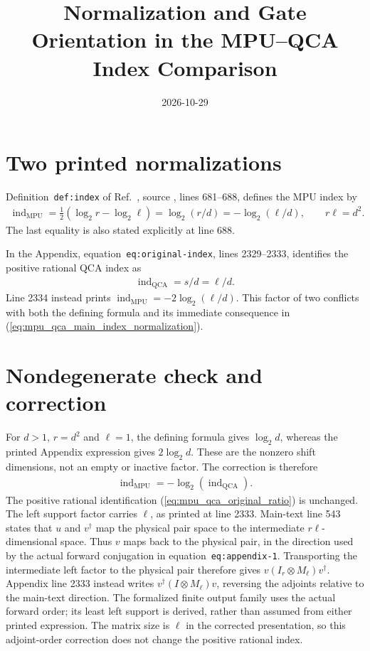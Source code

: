 \documentclass{article}
\title{Normalization and Gate Orientation in the MPU--QCA Index Comparison}
\author{}
\date{2026-10-29}
\begin{document}
\maketitle
{}

\section{Two printed normalizations}

Definition~\texttt{def:index} of Ref.~\cite{Cirac2017MPU}, source
, lines 681--688, defines the MPU index by
\begin{align}
    \operatorname{ind}_{\mathrm{MPU}}
    =\tfrac12(\log_2r-\log_2\ell)
    =\log_2(r/d)=-\log_2(\ell/d),
    \qquad r\ell=d^2.
    \label{eq:mpu_qca_main_index_normalization}
\end{align}
The last equality is also stated explicitly at line 688.

In the Appendix, equation~\texttt{eq:original-index}, lines 2329--2333,
identifies the positive rational QCA index as
\begin{align}
    \operatorname{ind}_{\mathrm{QCA}}=s/d=\ell/d.
    \label{eq:mpu_qca_original_ratio}
\end{align}
Line 2334 instead prints
$\operatorname{ind}_{\mathrm{MPU}}=-2\log_2(\ell/d)$.
This factor of two conflicts with both the defining formula and its
immediate consequence in (\ref{eq:mpu_qca_main_index_normalization}).

\section{Nondegenerate check and correction}

For $d>1$, $r=d^2$ and $\ell=1$, the defining formula gives
$\log_2d$, whereas the printed Appendix expression gives $2\log_2d$.
These are the nonzero shift dimensions, not an empty or inactive factor.
The correction is therefore
\begin{align}
    \operatorname{ind}_{\mathrm{MPU}}
    =-\log_2(\operatorname{ind}_{\mathrm{QCA}}).
    \label{eq:mpu_qca_corrected_log_relation}
\end{align}
The positive rational identification (\ref{eq:mpu_qca_original_ratio}) is
unchanged. The left support factor carries $\ell$, as printed at line 2333.
Main-text line 543 states that $u$ and $v^\dagger$ map the physical pair
space to the intermediate $r\ell$-dimensional space. Thus $v$ maps back
to the physical pair, in the direction used by the actual forward
conjugation in equation~\texttt{eq:appendix-1}. Transporting the intermediate
left factor to the physical pair therefore gives
$v(I_r\otimes M_\ell)v^\dagger$. Appendix line 2333 instead writes
$v^\dagger(I\otimes M_\ell)v$, reversing the adjoints relative to the
main-text direction. The formalized finite output family uses the actual
forward order; its least left support is derived, rather than assumed
from either printed expression. The matrix size is $\ell$ in the corrected
presentation, so this adjoint-order correction does not change the
positive rational index.
\end{document}

